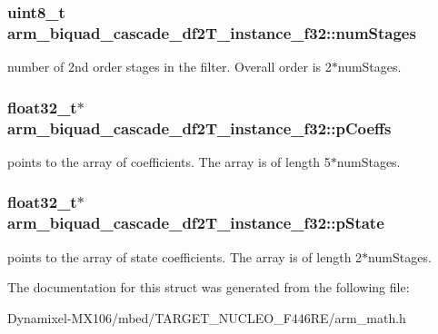 \subsubsection[{\texorpdfstring{num\+Stages}{numStages}}]{\setlength{\rightskip}{0pt plus 5cm}uint8\+\_\+t arm\+\_\+biquad\+\_\+cascade\+\_\+df2\+T\+\_\+instance\+\_\+f32\+::num\+Stages}\hypertarget{structarm__biquad__cascade__df2_t__instance__f32_a4d17958c33c3d0a905f974bac50f033f}{}\label{structarm__biquad__cascade__df2_t__instance__f32_a4d17958c33c3d0a905f974bac50f033f}
number of 2nd order stages in the filter. Overall order is 2$\ast$num\+Stages. 
\subsubsection[{\texorpdfstring{p\+Coeffs}{pCoeffs}}]{\setlength{\rightskip}{0pt plus 5cm}float32\+\_\+t$\ast$ arm\+\_\+biquad\+\_\+cascade\+\_\+df2\+T\+\_\+instance\+\_\+f32\+::p\+Coeffs}\hypertarget{structarm__biquad__cascade__df2_t__instance__f32_a49a24fe1b6ad3b0b26779c32d8d80b2e}{}\label{structarm__biquad__cascade__df2_t__instance__f32_a49a24fe1b6ad3b0b26779c32d8d80b2e}
points to the array of coefficients. The array is of length 5$\ast$num\+Stages. 
\subsubsection[{\texorpdfstring{p\+State}{pState}}]{\setlength{\rightskip}{0pt plus 5cm}float32\+\_\+t$\ast$ arm\+\_\+biquad\+\_\+cascade\+\_\+df2\+T\+\_\+instance\+\_\+f32\+::p\+State}\hypertarget{structarm__biquad__cascade__df2_t__instance__f32_a24d223addfd926a7177088cf2efe76b1}{}\label{structarm__biquad__cascade__df2_t__instance__f32_a24d223addfd926a7177088cf2efe76b1}
points to the array of state coefficients. The array is of length 2$\ast$num\+Stages. 

The documentation for this struct was generated from the following file\+:\begin{DoxyCompactItemize}
\item 
Dynamixel-\/\+M\+X106/mbed/\+T\+A\+R\+G\+E\+T\+\_\+\+N\+U\+C\+L\+E\+O\+\_\+\+F446\+R\+E/arm\+\_\+math.\+h\end{DoxyCompactItemize}
